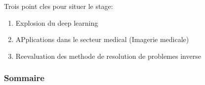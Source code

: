 \begin{frame}
  Trois point cles pour situer le stage:
  \begin{enumerate}
    \item Explosion du deep learning %
    \item APplications dans le secteur medical (Imagerie medicale) %
    \item Reevaluation des methode de resolution de problemes inverse %
  \end{enumerate}
  
\end{frame}

\begin{frame}
  \scriptsize
  \frametitle{Sommaire}
  \tableofcontents
\end{frame}


% 
